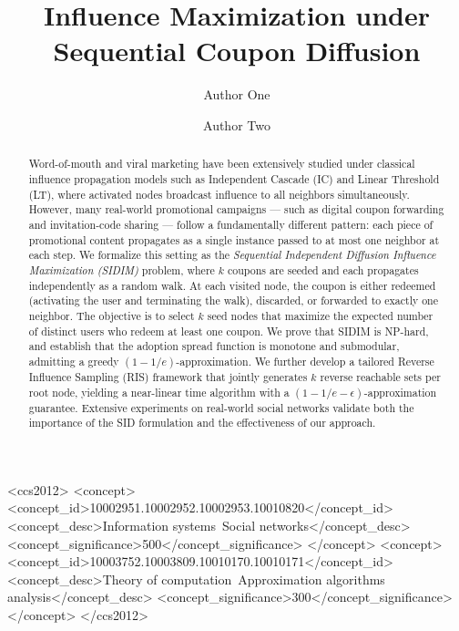 \documentclass[sigconf]{acmart}
\begin{document}
\title{Influence Maximization under Sequential Coupon Diffusion}

\author{Author One}

\author{Author Two}
\authornotemark[1]

\renewcommand{\shortauthors}{Author One et al.}

\begin{abstract}
Word-of-mouth and viral marketing have been extensively studied under classical influence propagation models such as Independent Cascade (IC) and Linear Threshold (LT), where activated nodes broadcast influence to all neighbors simultaneously. However, many real-world promotional campaigns --- such as digital coupon forwarding and invitation-code sharing --- follow a fundamentally different pattern: each piece of promotional content propagates as a single instance passed to at most one neighbor at each step. We formalize this setting as the \emph{Sequential Independent Diffusion Influence Maximization (SIDIM)} problem, where $k$ coupons are seeded and each propagates independently as a random walk. At each visited node, the coupon is either redeemed (activating the user and terminating the walk), discarded, or forwarded to exactly one neighbor. The objective is to select $k$ seed nodes that maximize the expected number of distinct users who redeem at least one coupon. We prove that SIDIM is NP-hard, and establish that the adoption spread function is monotone and submodular, admitting a greedy $(1-1/e)$-approximation. We further develop a tailored Reverse Influence Sampling (RIS) framework that jointly generates $k$ reverse reachable sets per root node, yielding a near-linear time algorithm with a $(1-1/e-\epsilon)$-approximation guarantee. Extensive experiments on real-world social networks validate both the importance of the SID formulation and the effectiveness of our approach.
\end{abstract}

\begin{CCSXML}
<ccs2012>
 <concept>
  <concept_id>10002951.10002952.10002953.10010820</concept_id>
  <concept_desc>Information systems~Social networks</concept_desc>
  <concept_significance>500</concept_significance>
 </concept>
 <concept>
  <concept_id>10003752.10003809.10010170.10010171</concept_id>
  <concept_desc>Theory of computation~Approximation algorithms analysis</concept_desc>
  <concept_significance>300</concept_significance>
 </concept>
</ccs2012>
\end{CCSXML}
\end{document}
